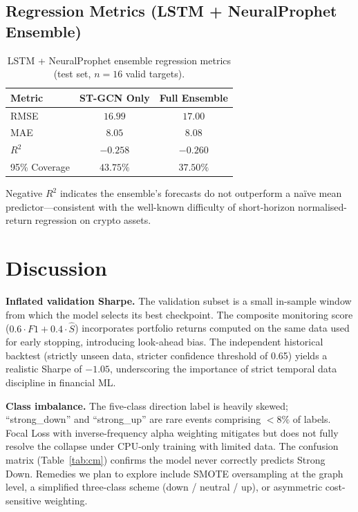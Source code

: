 \documentclass{article}
\begin{document}
\subsection{Regression Metrics (LSTM + NeuralProphet Ensemble)}

\begin{table}[h]
  \centering
  \caption{LSTM + NeuralProphet ensemble regression metrics (test set, $n=16$ valid targets).}
  \vspace{3pt}
  \label{tab:reg}
  \setlength{\tabcolsep}{8pt}
  \begin{tabular}{lcc}
    \toprule
    Metric        & ST-GCN Only & Full Ensemble \\
    \midrule
    RMSE          & $16.99$ & $17.00$ \\
    MAE           & $8.05$  & $8.08$  \\
    $R^2$         & $-0.258$ & $-0.260$ \\
    95\% Coverage & $43.75\%$ & $37.50\%$ \\
    \bottomrule
  \end{tabular}
\end{table}

Negative $R^2$ indicates the ensemble's forecasts do not outperform a na\"ive mean predictor---consistent with the well-known difficulty of short-horizon normalised-return regression on crypto assets.

\section{Discussion}

\textbf{Inflated validation Sharpe.} The validation subset is a small in-sample window from which the model selects its best checkpoint. The composite monitoring score ($0.6\!\cdot\! F1 + 0.4\!\cdot\!\hat{S}$) incorporates portfolio returns computed on the same data used for early stopping, introducing look-ahead bias. The independent historical backtest (strictly unseen data, stricter confidence threshold of 0.65) yields a realistic Sharpe of $-1.05$, underscoring the importance of strict temporal data discipline in financial ML.

\textbf{Class imbalance.} The five-class direction label is heavily skewed; ``strong\_down'' and ``strong\_up'' are rare events comprising $<8\%$ of labels. Focal Loss with inverse-frequency alpha weighting mitigates but does not fully resolve the collapse under CPU-only training with limited data. The confusion matrix (Table~\ref{tab:cm}) confirms the model never correctly predicts Strong Down. Remedies we plan to explore include SMOTE oversampling at the graph level, a simplified three-class scheme (down / neutral / up), or asymmetric cost-sensitive weighting.
\end{document}
